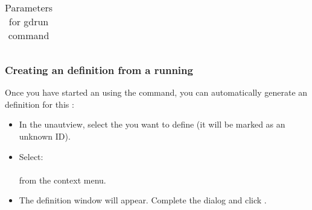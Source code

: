 \begin{enumerate}
\begin{table}[h]
\begin{tabular}{|l|l|}
	\end{tabular}
	\caption{Parameters for gdrun command}
	\label{paramscmd}
\end{table}
\end{enumerate}

\subsubsection{Creating an \gdaut{} definition from a running \gdaut{}}
\label{createAUTDef}
Once you have started an \gdaut{} using the  command, you can automatically generate an \gdaut{} definition  for this \gdaut{}:

\begin{itemize}
\item In the \app{}unautview{}, select the \gdaut{} you want to define (it will be marked as an unknown \gdaut{} ID).
\item Select:\\
 \\
from the context menu.
\item The \gdaut{} definition window will appear. Complete the dialog  and click .
\end{itemize}
